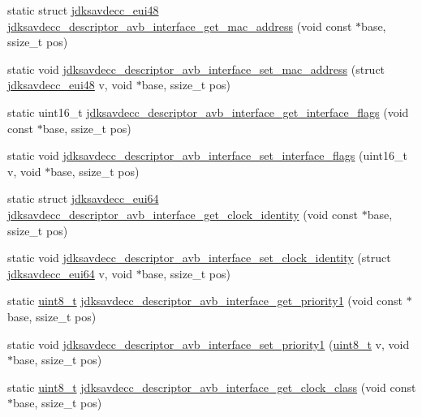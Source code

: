 \begin{DoxyCompactItemize}
static struct \hyperlink{structjdksavdecc__eui48}{jdksavdecc\+\_\+eui48} \hyperlink{group__descriptor__avb__interface_gaa297877e1ee6362552129e93a0715ced}{jdksavdecc\+\_\+descriptor\+\_\+avb\+\_\+interface\+\_\+get\+\_\+mac\+\_\+address} (void const $\ast$base, ssize\+\_\+t pos)
\item 
static void \hyperlink{group__descriptor__avb__interface_gaade556b8bbb92d3ddd58474d4e7e1d74}{jdksavdecc\+\_\+descriptor\+\_\+avb\+\_\+interface\+\_\+set\+\_\+mac\+\_\+address} (struct \hyperlink{structjdksavdecc__eui48}{jdksavdecc\+\_\+eui48} v, void $\ast$base, ssize\+\_\+t pos)
\item 
static uint16\+\_\+t \hyperlink{group__descriptor__avb__interface_ga1f0b55dd5a68d405d1679e8ef5540a14}{jdksavdecc\+\_\+descriptor\+\_\+avb\+\_\+interface\+\_\+get\+\_\+interface\+\_\+flags} (void const $\ast$base, ssize\+\_\+t pos)
\item 
static void \hyperlink{group__descriptor__avb__interface_ga9721f91ed03967331e70423a59900a4c}{jdksavdecc\+\_\+descriptor\+\_\+avb\+\_\+interface\+\_\+set\+\_\+interface\+\_\+flags} (uint16\+\_\+t v, void $\ast$base, ssize\+\_\+t pos)
\item 
static struct \hyperlink{structjdksavdecc__eui64}{jdksavdecc\+\_\+eui64} \hyperlink{group__descriptor__avb__interface_ga8826498bc53ae6a4dcd6f2e9cdf1c3db}{jdksavdecc\+\_\+descriptor\+\_\+avb\+\_\+interface\+\_\+get\+\_\+clock\+\_\+identity} (void const $\ast$base, ssize\+\_\+t pos)
\item 
static void \hyperlink{group__descriptor__avb__interface_ga3a5dacedaf57fbb5ecce46650e917b12}{jdksavdecc\+\_\+descriptor\+\_\+avb\+\_\+interface\+\_\+set\+\_\+clock\+\_\+identity} (struct \hyperlink{structjdksavdecc__eui64}{jdksavdecc\+\_\+eui64} v, void $\ast$base, ssize\+\_\+t pos)
\item 
static \hyperlink{stdint_8h_aba7bc1797add20fe3efdf37ced1182c5}{uint8\+\_\+t} \hyperlink{group__descriptor__avb__interface_ga582b25cdf077d01f72ae5140866ad6f3}{jdksavdecc\+\_\+descriptor\+\_\+avb\+\_\+interface\+\_\+get\+\_\+priority1} (void const $\ast$base, ssize\+\_\+t pos)
\item 
static void \hyperlink{group__descriptor__avb__interface_gaa4d33cfc4fb1754a9cdb2e1385311d88}{jdksavdecc\+\_\+descriptor\+\_\+avb\+\_\+interface\+\_\+set\+\_\+priority1} (\hyperlink{stdint_8h_aba7bc1797add20fe3efdf37ced1182c5}{uint8\+\_\+t} v, void $\ast$base, ssize\+\_\+t pos)
\item 
static \hyperlink{stdint_8h_aba7bc1797add20fe3efdf37ced1182c5}{uint8\+\_\+t} \hyperlink{group__descriptor__avb__interface_ga406b7e597940341766ede84e9cee7822}{jdksavdecc\+\_\+descriptor\+\_\+avb\+\_\+interface\+\_\+get\+\_\+clock\+\_\+class} (void const $\ast$base, ssize\+\_\+t pos)

\end{DoxyCompactItemize}
